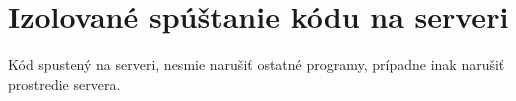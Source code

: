 \chapter{Izolované spúštanie kódu na serveri}

\label{kap:isolated_env} %

Kód spustený na serveri, nesmie narušiť ostatné programy, prípadne inak narušiť prostredie servera.

